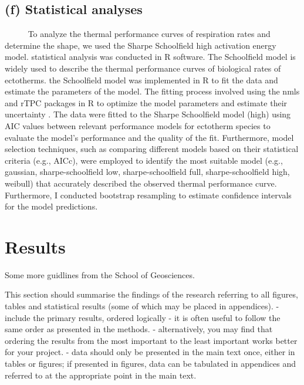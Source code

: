 \documentclass[
  12pt,
]{article}
\begin{document}
\hypertarget{f-statistical-analyses}{%
\subsection{(f) Statistical analyses}\label{f-statistical-analyses}}

~~~~~ To analyze the thermal performance curves of respiration rates and
determine the shape, we used the Sharpe Schoolfield high activation
energy model. statistical analysis was conducted in R software. The
Schoolfield model is widely used to describe the thermal performance
curves of biological rates of ectotherms. the Schoolfield model was
implemented in R to fit the data and estimate the parameters of the
model. The fitting process involved using the nmls and rTPC packages in
R to optimize the model parameters and estimate their uncertainty
\cite{padfield2021rtpc}. The data were fitted to the Sharpe Schoolfield
model (high) using AIC values between relevant performance models for
ectotherm species to evaluate the model's performance and the quality of
the fit. Furthermore, model selection techniques, such as comparing
different models based on their statistical criteria (e.g., AICc), were
employed to identify the most suitable model (e.g., gaussian,
sharpe-schoolfield low, sharpe-schoolfield full, sharpe-schoolfield
high, weibull) that accurately described the observed thermal
performance curve. Furthermore, I conducted bootstrap resampling to
estimate confidence intervals for the model predictions.

\newpage

\hypertarget{results}{%
\section{Results}\label{results}}

Some more guidlines from the School of Geosciences.

This section should summarise the findings of the research referring to
all figures, tables and statistical results (some of which may be placed
in appendices). - include the primary results, ordered logically - it is
often useful to follow the same order as presented in the methods. -
alternatively, you may find that ordering the results from the most
important to the least important works better for your project. - data
should only be presented in the main text once, either in tables or
figures; if presented in figures, data can be tabulated in appendices
and referred to at the appropriate point in the main text.
\end{document}
